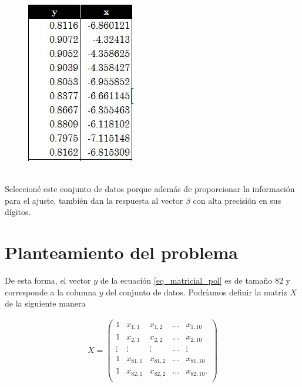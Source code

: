 \begin{figure}[h]
\begin{center}
\includegraphics[scale=0.5]{Imagenes/header_filip.JPG}
  \label{header_filip}
\end{center}
\end{figure}

\\
Seleccioné este conjunto de datos porque además de proporcionar la información para el ajuste, también dan la respuesta al vector $\beta$ con alta precisión en sus dígitos. 

\section{Planteamiento del problema}

De esta forma, el vector $y$ de la ecuación \ref{eq_matricial_pol} es de tamaño 82 y corresponde a la columna $y$ del conjunto de datos.
Podríamos definir la matriz $X$ de la siguiente manera

\begin{equation*}
    \begin{aligned}
    X = 
    \begin{pmatrix}
    1 & x_{1,1} & x_{1,2} & \dots & x_{1, 10}  \\
    1 & x_{2,1} & x_{2, 2} & \dots & x_{2, 10} \\
    \vdots & \vdots & \vdots & \dots & \vdots \\
    1 & x_{81,1} & x_{81, 2} & \dots & x_{81, 10} \\
    1 & x_{82,1} & x_{82, 2} & \dots & x_{82, 10}. \\
    \end{pmatrix}
    \end{aligned}
\end{equation*} 

